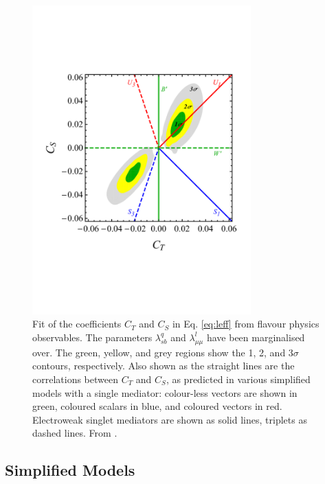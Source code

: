 \begin{figure}[tbh]
\begin{center}
      \includegraphics[width=0.75\textwidth]{SMS_fit.pdf} 
      \vspace*{-30mm}
   \caption{Fit of the coefficients $C_T$ and $C_S$ in Eq. \ref{eq:leff} from flavour physics observables. 
   	The parameters $\lambda^q_{sb}$ and  $\lambda^l_{\mu\mu}$ have been marginalised over. 
   	The green, yellow, and grey regions show the 1, 2, and 3$\sigma$ contours, respectively. 
   	Also shown as the straight lines are the correlations between $C_T$ and $C_S$, as predicted in various simplified models with a single mediator: colour-less vectors are shown in green, coloured scalars in blue, and coloured vectors in red. 
   	Electroweak singlet mediators are shown as solid lines, triplets as dashed lines. 
   	From \citep{Buttazzo:2017ixm}.}
\label{fig:fit}
\end{center}
\end{figure}

\subsection{Simplified Models}
\label{sec:B-SimMod}

